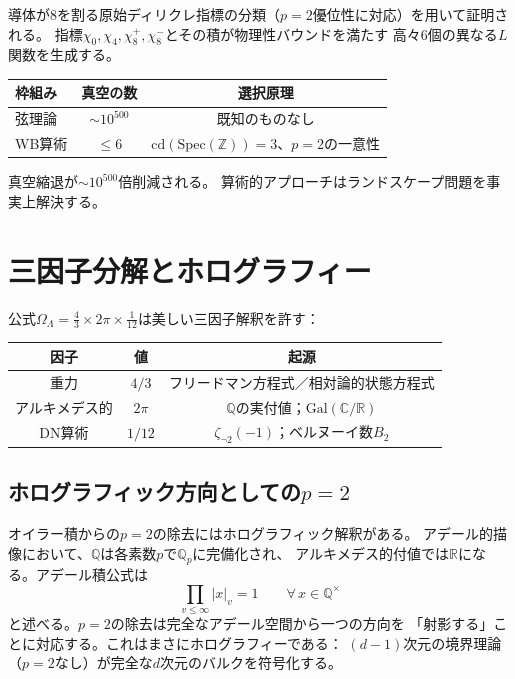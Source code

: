 \documentclass[12pt,a4paper]{article}
\theoremstyle{definition}
\newcommand{\Spec}{\mathrm{Spec}}
\newcommand{\cd}{\mathrm{cd}}
\newcommand{\Gal}{\mathrm{Gal}}
\newcommand{\Z}{\mathbb{Z}}
\newcommand{\Q}{\mathbb{Q}}
\newcommand{\R}{\mathbb{R}}
\newcommand{\C}{\mathbb{C}}
\newcommand{\OmL}{\Omega_\Lambda}
\newcommand{\zetanot}{\zeta_{\neg 2}}
\begin{document}
導体が$8$を割る原始ディリクレ指標の分類（$p=2$優位性に対応）を用いて証明される。
指標$\chi_0,\chi_4,\chi_8^+,\chi_8^-$とその積が物理性バウンドを満たす
高々6個の異なる$L$関数を生成する。

\begin{center}
\begin{tabular}{lcc}
\toprule
\textbf{枠組み} & \textbf{真空の数} & \textbf{選択原理} \\
\midrule
弦理論           & $\sim 10^{500}$   & 既知のものなし \\
WB算術           & $\le 6$           & $\cd(\Spec(\Z))=3$、$p=2$の一意性 \\
\bottomrule
\end{tabular}
\end{center}

真空縮退が$\sim 10^{500}$倍削減される。
算術的アプローチはランドスケープ問題を事実上解決する。

\section{三因子分解とホログラフィー}\label{sec:decomp}

公式$\OmL=\frac{4}{3}\times 2\pi\times\frac{1}{12}$は美しい三因子解釈を許す：

\begin{center}
\begin{tabular}{ccc}
\toprule
\textbf{因子} & \textbf{値} & \textbf{起源} \\
\midrule
重力             & $4/3$   & フリードマン方程式／相対論的状態方程式 \\
アルキメデス的   & $2\pi$  & $\Q$の実付値；$\Gal(\C/\R)$ \\
DN算術           & $1/12$  & $\zetanot(-1)$；ベルヌーイ数$B_2$ \\
\bottomrule
\end{tabular}
\end{center}

\subsection{ホログラフィック方向としての$p=2$}

オイラー積からの$p=2$の除去にはホログラフィック解釈がある。
アデール的描像において、$\Q$は各素数$p$で$\Q_p$に完備化され、
アルキメデス的付値では$\R$になる。アデール積公式は
\[
  \prod_{v\le\infty}|x|_v=1\qquad\forall\,x\in\Q^\times
\]
と述べる。$p=2$の除去は完全なアデール空間から一つの方向を
「射影する」ことに対応する。これはまさにホログラフィーである：
$(d-1)$次元の境界理論（$p=2$なし）が完全な$d$次元のバルクを符号化する。
\end{document}
